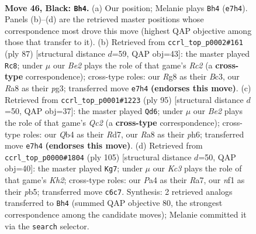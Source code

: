 \documentclass[11pt]{article}
\begin{document}
\clearpage

\begin{figure}[p]\centering
\begin{subfigure}{0.46\textwidth}\centering
\resizebox{\linewidth}{!}{%
\newchessgame
\chessboard[
  setfen={r5r1/p3b1p1/2k4p/3p1Q1P/pq1P2P1/4P3/6K1/5N2 b - - 1 46},
  showmover=false,
  pgfstyle=straightmove, color=movearrow, markmove={e7-h4}
]}
\caption{}
\end{subfigure}\hfill
\begin{subfigure}{0.46\textwidth}\centering
\resizebox{\linewidth}{!}{%
\newchessgame
\chessboard[
  setfen={8/k1r1qp2/p6p/P2Q2p1/1p6/1Nb1P1PP/5PB1/6K1 b - - 8 44},
  showmover=false,
  pgfstyle=straightmove, color=movearrow, markmove={c7-c8}
]}
\caption{}
\end{subfigure}
\\[4pt]
\begin{subfigure}{0.46\textwidth}\centering
\resizebox{\linewidth}{!}{%
\newchessgame
\chessboard[
  setfen={5k2/2qr3p/1p4pP/p4pN1/P2P4/4Q1P1/1P3P2/6K1 b - - 20 48},
  showmover=false,
  pgfstyle=straightmove, color=movearrow, markmove={c7-d6}
]}
\caption{}
\end{subfigure}\hfill
\begin{subfigure}{0.46\textwidth}\centering
\resizebox{\linewidth}{!}{%
\newchessgame
\chessboard[
  setfen={8/r4p1k/1p4p1/1P1Q4/4PP1b/q5pP/4N1P1/1R3K2 b - - 2 53},
  showmover=false,
  pgfstyle=straightmove, color=movearrow, markmove={h7-g7}
]}
\caption{}
\end{subfigure}
\caption{\textbf{Move 46, Black: \texttt{Bh4}.} (a) Our position; Melanie plays \texttt{Bh4} (\texttt{e7h4}). Panels (b)--(d) are the retrieved master positions whose correspondence most drove this move (highest QAP objective among those that transfer to it). (b) Retrieved from \texttt{ccrl\_top\_p0002\#161} (ply 87) [structural distance $d$=59, QAP obj=43]: the master played \texttt{Rc8}; under $\mu$ our \emph{Be2} plays the role of that game's \emph{Rc2} (a \textbf{cross-type} correspondence); cross-type roles: our \emph{R}g8 as their \emph{B}c3, our \emph{R}a8 as their \emph{p}g3; transferred move \texttt{e7h4} \textbf{(endorses this move)}. (c) Retrieved from \texttt{ccrl\_top\_p0001\#1223} (ply 95) [structural distance $d$=50, QAP obj=37]: the master played \texttt{Qd6}; under $\mu$ our \emph{Be2} plays the role of that game's \emph{Qc2} (a \textbf{cross-type} correspondence); cross-type roles: our \emph{Q}b4 as their \emph{R}d7, our \emph{R}a8 as their \emph{p}h6; transferred move \texttt{e7h4} \textbf{(endorses this move)}. (d) Retrieved from \texttt{ccrl\_top\_p0000\#1804} (ply 105) [structural distance $d$=50, QAP obj=40]: the master played \texttt{Kg7}; under $\mu$ our \emph{Kc3} plays the role of that game's \emph{Kh2}; cross-type roles: our \emph{P}a4 as their \emph{R}a7, our \emph{n}f1 as their \emph{p}b5; transferred move \texttt{c6c7}. Synthesis: 2 retrieved analogs transferred to \texttt{Bh4} (summed QAP objective 80, the strongest correspondence among the candidate moves); Melanie committed it via the \texttt{search} selector.}
\label{fig:thought-m91}
\end{figure}
\end{document}
